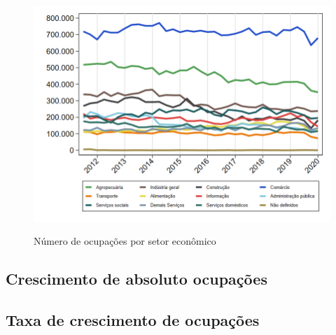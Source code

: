 \documentclass[10pt]{beamer}
\begin{document}
\begin{frame}
\textit{\hyperlink{indice_principal_amz_jovem}{}}
\begin{figure}
  \centering
  \includegraphics[width=.85\linewidth]{./../analysis/output/_amz_jovem_importancia_relativa.png}
  \label{_amz_jovem_importancia_relativa}
  \caption{{Número de ocupações por setor econômico}}
\end{figure}
\end{frame}

\subsection{Crescimento de absoluto ocupações}

\begin{frame}
\textit{\hyperlink{indice_principal_amz_jovem}{}}

\end{frame}

\begin{frame}
\textit{\hyperlink{indice_principal_amz_jovem}{}}

\end{frame}

\begin{frame}
\textit{\hyperlink{indice_principal_amz_jovem}{}}

\end{frame}

\subsection{Taxa de crescimento de ocupações}
\end{document}
